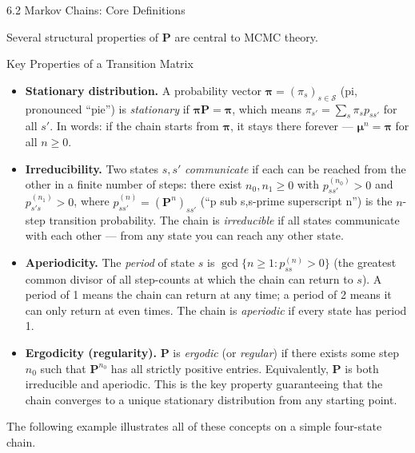 \documentclass[aspectratio=169,10pt]{beamer}
\newcommand{\bfP}{\mathbf{P}}
\newcommand{\bfpi}{\bm{\pi}}
\newcommand{\bfmu}{\bm{\mu}}
\begin{document}
\begin{frame}[allowframebreaks]{6.2 Markov Chains: Core Definitions}
\framebreak

Several structural properties of $\bfP$ are central to MCMC theory.

\begin{block}{Key Properties of a Transition Matrix}
\begin{itemize}
  \item \textbf{Stationary distribution.} A probability vector $\bfpi = (\pi_s)_{s \in \mathcal{S}}$ (pi, pronounced ``pie'') is \emph{stationary} if $\bfpi \bfP = \bfpi$, which means $\pi_{s'} = \sum_{s} \pi_s p_{ss'}$ for all $s'$.
  In words: if the chain starts from $\bfpi$, it stays there forever --- $\bfmu^n = \bfpi$ for all $n \ge 0$.

  \item \textbf{Irreducibility.} Two states $s, s'$ \emph{communicate} if each can be reached from the other in a finite number of steps: there exist $n_0, n_1 \ge 0$ with $p_{ss'}^{(n_0)} > 0$ and $p_{s's}^{(n_1)} > 0$, where $p_{ss'}^{(n)} = (\bfP^n)_{ss'}$ (``p sub s,s-prime superscript n'') is the $n$-step transition probability.
  The chain is \emph{irreducible} if all states communicate with each other --- from any state you can reach any other state.

  \item \textbf{Aperiodicity.} The \emph{period} of state $s$ is $\gcd\{n \ge 1 : p_{ss}^{(n)} > 0\}$ (the greatest common divisor of all step-counts at which the chain can return to $s$).
  A period of 1 means the chain can return at any time; a period of 2 means it can only return at even times.
  The chain is \emph{aperiodic} if every state has period 1.

  \item \textbf{Ergodicity (regularity).} $\bfP$ is \emph{ergodic} (or \emph{regular}) if there exists some step $n_0$ such that $\bfP^{n_0}$ has all strictly positive entries.
  Equivalently, $\bfP$ is both irreducible and aperiodic.
  This is the key property guaranteeing that the chain converges to a unique stationary distribution from any starting point.
\end{itemize}
\end{block}

\framebreak

The following example illustrates all of these concepts on a simple four-state chain.


\end{frame}
\end{document}
